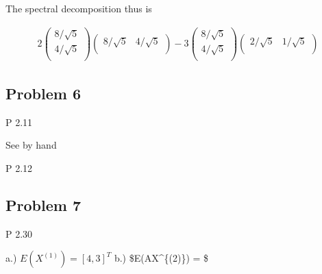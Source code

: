 \documentclass[
]{article}
\newenvironment{Shaded}{\begin{snugshade}}{\end{snugshade}}
\newcommand{\CommentTok}[1]{\textcolor[rgb]{0.56,0.35,0.01}{\textit{#1}}}
\newcommand{\DataTypeTok}[1]{\textcolor[rgb]{0.13,0.29,0.53}{#1}}
\newcommand{\DecValTok}[1]{\textcolor[rgb]{0.00,0.00,0.81}{#1}}
\newcommand{\KeywordTok}[1]{\textcolor[rgb]{0.13,0.29,0.53}{\textbf{#1}}}
\newcommand{\NormalTok}[1]{#1}
\newcommand{\OperatorTok}[1]{\textcolor[rgb]{0.81,0.36,0.00}{\textbf{#1}}}
\newcommand{\StringTok}[1]{\textcolor[rgb]{0.31,0.60,0.02}{#1}}
\begin{document}
The spectral decomposition thus is

\begin{align*}
2 \begin{pmatrix}
8/\sqrt{5}\\
4/\sqrt{5}\\
\end{pmatrix} \begin{pmatrix}
8/\sqrt{5} & 4/\sqrt{5}\\
\end{pmatrix} - 3 \begin{pmatrix}
8/\sqrt{5}\\
4/\sqrt{5}\\
\end{pmatrix} \begin{pmatrix}
2/\sqrt{5} & 1/\sqrt{5}\\
\end{pmatrix}
\end{align*}

\hypertarget{problem-6}{%
\subsection{Problem 6}\label{problem-6}}

P 2.11

See by hand

P 2.12

\hypertarget{problem-7}{%
\subsection{Problem 7}\label{problem-7}}

P 2.30

a.) \(E(X^{(1)}) = [4,3]^T\) b.) \$E(AX\^{}\{(2)\}) = \$

\begin{Shaded}
\end{Shaded}
\end{document}
